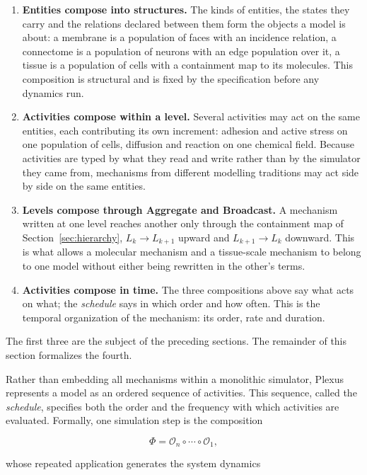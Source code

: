 \documentclass[11pt]{article}
\begin{document}
\begin{enumerate}
\item \textbf{Entities compose into structures.} The kinds of entities, the states
they carry and the relations declared between them form the objects a model is about:
a membrane is a population of faces with an incidence relation, a connectome is a
population of neurons with an edge population over it, a tissue is a population of
cells with a containment map to its molecules. This composition is structural and is
fixed by the specification before any dynamics run.

\item \textbf{Activities compose within a level.} Several activities may act on the
same entities, each contributing its own increment: adhesion and active stress on one
population of cells, diffusion and reaction on one chemical field. Because activities
are typed by what they read and write rather than by the simulator they came from,
mechanisms from different modelling traditions may act side by side on the same
entities.

\item \textbf{Levels compose through Aggregate and Broadcast.} A mechanism
written at one level reaches another only through the containment map of
Section~\ref{sec:hierarchy}, $L_k \to L_{k+1}$ upward and $L_{k+1} \to L_k$
downward. This is what allows a molecular mechanism and a tissue-scale mechanism
to belong to one model without either being rewritten in the other's terms.

\item \textbf{Activities compose in time.} The three compositions above say what
acts on what; the \emph{schedule} says in which order and how often. This is the
temporal organization of the mechanism: its order, rate and duration.
\end{enumerate}

The first three are the subject of the preceding sections. The remainder of this
section formalizes the fourth.

Rather than embedding all mechanisms within a monolithic simulator, Plexus
represents a model as an ordered sequence of activities. This sequence, called the
\emph{schedule}, specifies both the order and the frequency with which activities are
evaluated. Formally, one simulation step is the composition

\[
\Phi
=
\mathcal O_n
\circ
\cdots
\circ
\mathcal O_1,
\]

whose repeated application generates the system dynamics
\end{document}
